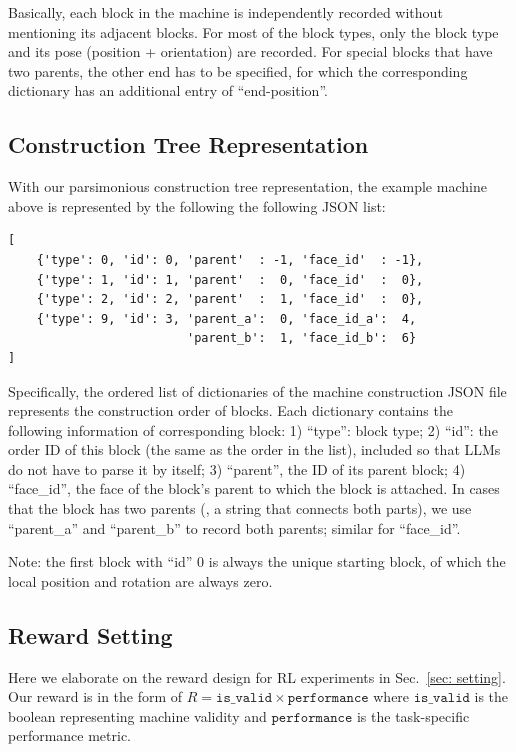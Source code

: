 Basically, each block in the machine is independently recorded without mentioning its adjacent blocks. For most of the block types, only the block type and its pose (position + orientation) are recorded. For special blocks that have two parents, the other end has to be specified, for which the corresponding dictionary has an additional entry of ``end-position''.


\subsection{Construction Tree Representation}
\label{sec:tree_rep}

With our parsimonious construction tree representation, the example machine above is represented by the following the following JSON list:
\begin{lstlisting}
[
    {'type': 0, 'id': 0, 'parent'  : -1, 'face_id'  : -1}, 
    {'type': 1, 'id': 1, 'parent'  :  0, 'face_id'  :  0}, 
    {'type': 2, 'id': 2, 'parent'  :  1, 'face_id'  :  0}, 
    {'type': 9, 'id': 3, 'parent_a':  0, 'face_id_a':  4,
                         'parent_b':  1, 'face_id_b':  6}
]
\end{lstlisting}

Specifically, the ordered list of dictionaries of the machine construction JSON file represents the construction order of blocks. Each dictionary contains the following information of corresponding block: 1) ``type'': block type; 2) ``id'': the order ID of this block (the same as the order in the list), included so that LLMs do not have to parse it by itself; 3) ``parent'', the ID of its parent block; 4) ``face\_id'', the face of the block's parent to which the block is attached. In cases that the block has two parents (\eg, a string that connects both parts), we use ``parent\_a'' and ``parent\_b'' to record both parents; similar for ``face\_id''.

Note: the first block with ``id'' 0 is always the unique starting block, of which the local position and rotation are always zero. 








\subsection{Reward Setting} \label{sec:reward setting}

Here we elaborate on the reward design for RL experiments in Sec.~\ref{sec: setting}. Our reward is in the form of $R = \texttt{is\_valid} \times \texttt{performance}$ where $\texttt{is\_valid}$ is the boolean representing machine validity and $\texttt{performance}$ is the task-specific performance metric.



